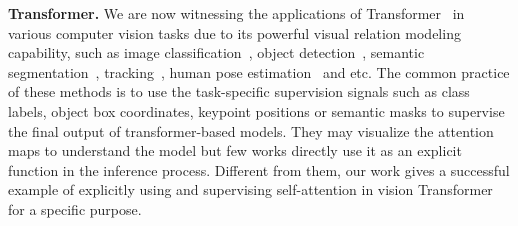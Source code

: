 \documentclass{article} \usepackage{iclr_conference,times}
\begin{document}
{\bf Transformer.} We are now witnessing the applications of Transformer~\citep{vaswani2017attention} in various computer vision tasks due to its powerful visual relation modeling capability, such as image classification~\citep{vit:dosovitskiy2020image, deit:touvron2020deit}, object detection~\citep{detr:carion2020detr, deformdetr:zhu2020deformable}, semantic segmentation~\citep{setr:zheng2021rethinking}, tracking~\citep{transtrack:sun2020transtrack, trackformer:meinhardt2021trackformer}, human pose estimation~\citep{metro:lin2021end, prtr:li2021pose,transpose:yang2021transpose, tokenpose:li2021tokenpose, stoffl2021end} and etc. 
The common practice of these methods is to use the task-specific supervision signals such as class labels, object box coordinates, keypoint positions or semantic masks to supervise the final output of transformer-based models. They may visualize the attention maps to understand the model but few works directly use it as an explicit function in the inference process. 
Different from them, our work gives a successful example of explicitly using and supervising self-attention in vision Transformer for a specific purpose.
\end{document}
